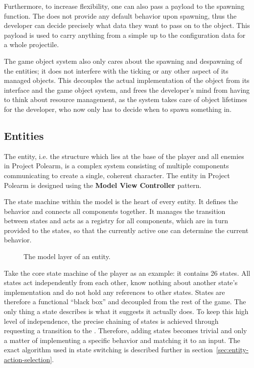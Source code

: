 \documentclass[../Main.tex]{subfiles}
\begin{document}
Furthermore, to increase flexibility, one can also pass a payload to the spawning function. The  does not provide any default behavior upon spawning, thus the developer can decide precisely what data they want to pass on to the object. This payload is used to carry anything from a simple  up to the configuration data for a whole projectile.

The game object system also only cares about the spawning and despawning of the entities; it does not interfere with the ticking or any other aspect of its managed objects. This decouples the actual implementation of the object from its interface and the game object system, and frees the developer's mind from having to think about resource management, as the system takes care of object lifetimes for the developer, who now only has to decide when to spawn something in.

\subsection{Entities}\label{sec:architecture-entities}

The entity, i.e. the structure which lies at the base of the player and all enemies in Project Polearm, is a complex system consisting of multiple components communicating to create a single, coherent character. The entity in Project Polearm is designed using the \textbf{Model View Controller} pattern.

The state machine within the model is the heart of every entity. It defines the behavior and connects all components together. It manages the transition between states and acts as a registry for all components, which are in turn provided to the states, so that the currently active one can determine the current behavior.

\begin{figure}[H]
    \centering
    
    \caption[The model layer of an entity. Own figure.]{The model layer of an entity.}
    \label{fig:entity-model}
\end{figure}

Take the core state machine of the player as an example: it contains 26 states. All states act independently from each other, know nothing about another state's implementation and do not hold any references to other states. States are therefore a functional \enquote{black box} and decoupled from the rest of the game. The only thing a state describes is what it suggests it actually does. To keep this high level of independence, the precise chaining of states is achieved through requesting a transition to the . Therefore, adding states becomes trivial and only a matter of implementing a specific behavior and matching it to an input. The exact algorithm used in state switching is described further in section~\ref{sec:entity-action-selection}.
\end{document}
